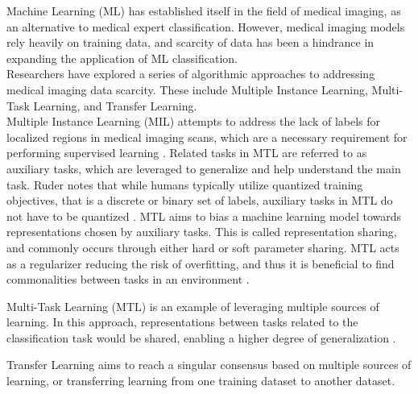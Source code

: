 \documentclass[../report.tex]{subfiles}
\begin{document}

Machine Learning (ML) has established itself in the field of medical imaging, as an alternative to medical expert classification. However, medical imaging models rely heavily on training data, and scarcity of data has been a hindrance in expanding the application of ML classification. \\


Researchers have explored a series of algorithmic approaches to addressing medical imaging data scarcity. These include Multiple Instance Learning, Multi-Task Learning, and Transfer Learning. \\

Multiple Instance Learning (MIL) attempts to address the lack of labels for localized regions in medical imaging scans, which are a necessary requirement for performing supervised learning \cite{Ruder2017MTL}. Related tasks in MTL are referred to as auxiliary tasks, which are leveraged to generalize and help understand the main task. Ruder notes that while humans typically utilize quantized training objectives, that is a discrete or binary set of labels, auxiliary tasks in MTL do not have to be quantized \cite{Ruder2017MTL}. MTL aims to bias a machine learning model towards representations chosen by auxiliary tasks. This is called representation sharing, and commonly occurs through either hard or soft parameter sharing. MTL acts as a regularizer reducing the risk of overfitting, and thus it is beneficial to find commonalities between tasks in an environment \cite{Ruder2017MTL}.

Multi-Task Learning (MTL) is an example of leveraging multiple sources of learning. In this approach, representations between tasks related to the classification task would be shared, enabling a higher degree of generalization \cite{Ruder2017MTL}.

Transfer Learning aims to reach a singular consensus based on multiple sources of learning, or transferring learning from one training dataset to another dataset. \\
\end{document}
